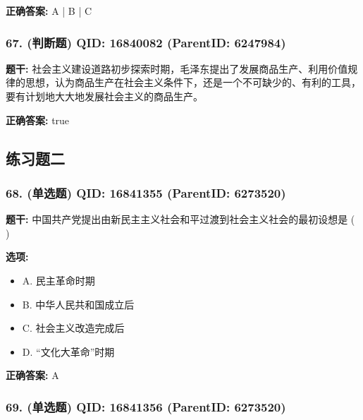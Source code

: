 \documentclass[12pt,UTF8]{ctexart}
\begin{document}
\textbf{正确答案:}
A | B | C

\vspace{0.3em}\hrulefill\vspace{0.7em}

\subsubsection*{67. (判断题) \small QID: 16840082 (ParentID: 6247984)}

\textbf{题干:}
社会主义建设道路初步探索时期，毛泽东提出了发展商品生产、利用价值规律的思想，认为商品生产在社会主义条件下，还是一个不可缺少的、有利的工具，要有计划地大大地发展社会主义的商品生产。



\textbf{正确答案:}
true

\vspace{0.3em}\hrulefill\vspace{0.7em}

\subsection*{练习题二}

\subsubsection*{68. (单选题) \small QID: 16841355 (ParentID: 6273520)}

\textbf{题干:}
中国共产党提出由新民主主义社会和平过渡到社会主义社会的最初设想是 ( )



\textbf{选项:}
\begin{itemize}[leftmargin=*]

  \item A. 民主革命时期

  \item B. 中华人民共和国成立后

  \item C. 社会主义改造完成后

  \item D. “文化大革命”时期

\end{itemize}

\textbf{正确答案:}
A

\vspace{0.3em}\hrulefill\vspace{0.7em}

\subsubsection*{69. (单选题) \small QID: 16841356 (ParentID: 6273520)}
\end{document}
